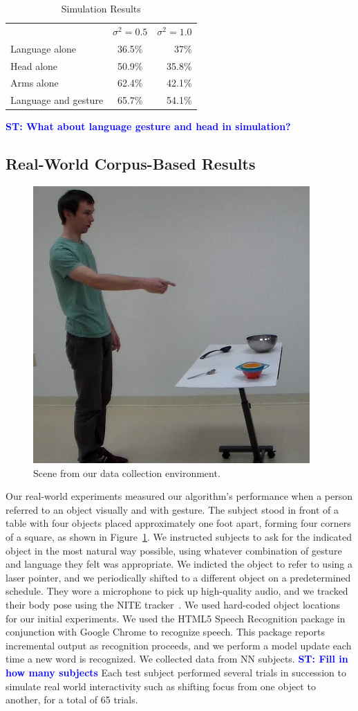 \documentclass[letterpaper, 10 pt, conference]{ieeeconf}
\newcommand{\stnote}[1]{\textcolor{Blue}{\textbf{ST: #1}}}
\begin{document}
\begin{table}
\centering
\caption{Simulation Results\label{table:sim_results}}
\begin{tabular}{lcr}
& $\sigma^2 = 0.5$ & $\sigma^2 = 1.0$\\
Language alone &  36.5\% & 37\%\\
Head alone & 50.9\% & 35.8\%\\
Arms alone & 62.4\% & 42.1\%\\
Language and gesture &  65.7\% & 54.1\%
\end{tabular}
\stnote{What about language gesture and head in simulation?}
\end{table}

\subsection{Real-World Corpus-Based Results}

\begin{figure}
\centering
\includegraphics[width=0.5\linewidth]{figures/dataset.png}
\caption{Scene from our data collection environment.\label{fig:corpus_scene}}
\end{figure}

Our real-world experiments measured our algorithm's performance when a
person referred to an object visually and with gesture.  The subject
stood in front of a table with four objects placed approximately one
foot apart, forming four corners of a square, as shown in
Figure~\ref{fig:corpus_scene}.  We instructed subjects to ask for the
indicated object in the most natural way possible, using whatever
combination of gesture and language they felt was appropriate. We
indicted the object to refer to using a laser pointer, and we
periodically shifted to a different object on a predetermined
schedule.  They wore a microphone to pick up high-quality audio, and
we tracked their body pose using the NITE tracker~\citep{openni}.  We
used hard-coded object locations for our initial experiments.  We used
the HTML5 Speech Recognition package in conjunction with Google Chrome
to recognize speech.  This package reports incremental output as
recognition proceeds, and we perform a model update each time a new
word is recognized.  We collected data from NN subjects.  \stnote{Fill
  in how many subjects} Each test subject performed several trials in
succession to simulate real world interactivity such as shifting focus
from one object to another, for a total of 65 trials.
\end{document}
